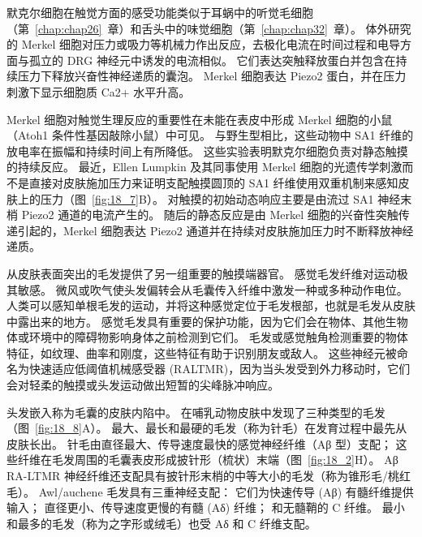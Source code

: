默克尔细胞在触觉方面的感受功能类似于耳蜗中的听觉毛细胞（第~\ref{chap:chap26}~章）和舌头中的味觉细胞（第~\ref{chap:chap32}~章）。
体外研究的 Merkel 细胞对压力或吸力等机械力作出反应，去极化电流在时间过程和电导方面与孤立的 DRG 神经元中诱发的电流相似。
它们表达突触释放蛋白并包含在持续压力下释放兴奋性神经递质的囊泡。
Merkel 细胞表达 Piezo2 蛋白，并在压力刺激下显示细胞质 Ca2+ 水平升高。


Merkel 细胞对触觉生理反应的重要性在未能在表皮中形成 Merkel 细胞的小鼠（Atoh1 条件性基因敲除小鼠）中可见。
与野生型相比，这些动物中 SA1 纤维的放电率在振幅和持续时间上有所降低。
这些实验表明默克尔细胞负责对静态触摸的持续反应。 
最近，Ellen Lumpkin 及其同事使用 Merkel 细胞的光遗传学刺激而不是直接对皮肤施加压力来证明支配触摸圆顶的 SA1 纤维使用双重机制来感知皮肤上的压力（图~\ref{fig:18_7}B）。
对触摸的初始动态响应主要是由流过 SA1 神经末梢 Piezo2 通道的电流产生的。
随后的静态反应是由 Merkel 细胞的兴奋性突触传递引起的，Merkel 细胞表达 Piezo2 通道并在持续对皮肤施加压力时不断释放神经递质。


从皮肤表面突出的毛发提供了另一组重要的触摸端器官。 
感觉毛发纤维对运动极其敏感。
微风或吹气使头发偏转会从毛囊传入纤维中激发一种或多种动作电位。
人类可以感知单根毛发的运动，并将这种感觉定位于毛发根部，也就是毛发从皮肤中露出来的地方。
感觉毛发具有重要的保护功能，因为它们会在物体、其他生物体或环境中的障碍物影响身体之前检测到它们。
毛发或感觉触角检测重要的物体特征，如纹理、曲率和刚度，这些特征有助于识别朋友或敌人。
这些神经元被命名为快速适应低阈值机械感受器 (RALTMR)，因为当头发受到外力移动时，它们会对轻柔的触摸或头发运动做出短暂的尖峰脉冲响应。


头发嵌入称为毛囊的皮肤内陷中。
在哺乳动物皮肤中发现了三种类型的毛发（图~\ref{fig:18_8}A）。
最大、最长和最硬的毛发（称为针毛）在发育过程中最先从皮肤长出。
针毛由直径最大、传导速度最快的感觉神经纤维（Aβ 型）支配；
这些纤维在毛发周围的毛囊表皮形成披针形（梳状）末端（图~\ref{fig:18_2}H）。
Aβ RA-LTMR 神经纤维还支配具有披针形末梢的中等大小的毛发（称为锥形毛/桃红毛）。
Awl/auchene 毛发具有三重神经支配：
它们为快速传导 (Aβ) 有髓纤维提供输入；
直径更小、传导速度更慢的有髓 (Aδ) 纤维；
和无髓鞘的 C 纤维。
最小和最多的毛发（称为之字形或绒毛）也受 Aδ 和 C 纤维支配。


